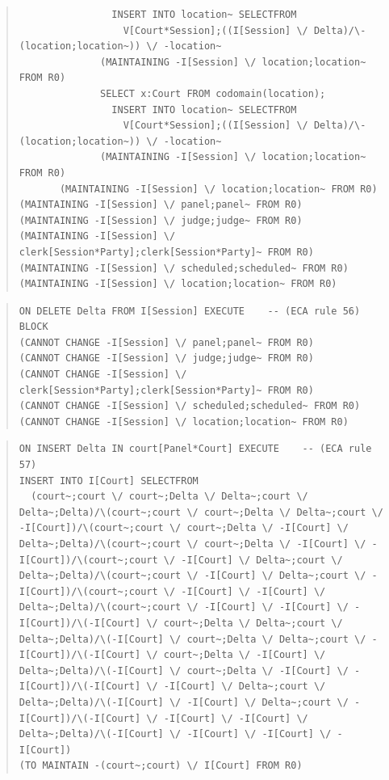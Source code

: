 \documentclass[10pt,a4paper]{report}              %
\theoremstyle{plain}\theorembodyfont{\rmfamily}\newtheorem{definition}{Definition}[section]
\theoremstyle{plain}\theorembodyfont{\rmfamily}\newtheorem{designrule}[definition]{Requirement}
\begin{document}
\begin{quote}
\begin{verbatim}
                INSERT INTO location~ SELECTFROM
                  V[Court*Session];((I[Session] \/ Delta)/\-(location;location~)) \/ -location~
              (MAINTAINING -I[Session] \/ location;location~ FROM R0)
              SELECT x:Court FROM codomain(location);
                INSERT INTO location~ SELECTFROM
                  V[Court*Session];((I[Session] \/ Delta)/\-(location;location~)) \/ -location~
              (MAINTAINING -I[Session] \/ location;location~ FROM R0)
       (MAINTAINING -I[Session] \/ location;location~ FROM R0)
(MAINTAINING -I[Session] \/ panel;panel~ FROM R0)
(MAINTAINING -I[Session] \/ judge;judge~ FROM R0)
(MAINTAINING -I[Session] \/ clerk[Session*Party];clerk[Session*Party]~ FROM R0)
(MAINTAINING -I[Session] \/ scheduled;scheduled~ FROM R0)
(MAINTAINING -I[Session] \/ location;location~ FROM R0)
\end{verbatim}
\end{quote}
\begin{quote}
\begin{verbatim}
ON DELETE Delta FROM I[Session] EXECUTE    -- (ECA rule 56)
BLOCK
(CANNOT CHANGE -I[Session] \/ panel;panel~ FROM R0)
(CANNOT CHANGE -I[Session] \/ judge;judge~ FROM R0)
(CANNOT CHANGE -I[Session] \/ clerk[Session*Party];clerk[Session*Party]~ FROM R0)
(CANNOT CHANGE -I[Session] \/ scheduled;scheduled~ FROM R0)
(CANNOT CHANGE -I[Session] \/ location;location~ FROM R0)
\end{verbatim}
\end{quote}
\begin{quote}
\begin{verbatim}
ON INSERT Delta IN court[Panel*Court] EXECUTE    -- (ECA rule 57)
INSERT INTO I[Court] SELECTFROM
  (court~;court \/ court~;Delta \/ Delta~;court \/ Delta~;Delta)/\(court~;court \/ court~;Delta \/ Delta~;court \/ -I[Court])/\(court~;court \/ court~;Delta \/ -I[Court] \/ Delta~;Delta)/\(court~;court \/ court~;Delta \/ -I[Court] \/ -I[Court])/\(court~;court \/ -I[Court] \/ Delta~;court \/ Delta~;Delta)/\(court~;court \/ -I[Court] \/ Delta~;court \/ -I[Court])/\(court~;court \/ -I[Court] \/ -I[Court] \/ Delta~;Delta)/\(court~;court \/ -I[Court] \/ -I[Court] \/ -I[Court])/\(-I[Court] \/ court~;Delta \/ Delta~;court \/ Delta~;Delta)/\(-I[Court] \/ court~;Delta \/ Delta~;court \/ -I[Court])/\(-I[Court] \/ court~;Delta \/ -I[Court] \/ Delta~;Delta)/\(-I[Court] \/ court~;Delta \/ -I[Court] \/ -I[Court])/\(-I[Court] \/ -I[Court] \/ Delta~;court \/ Delta~;Delta)/\(-I[Court] \/ -I[Court] \/ Delta~;court \/ -I[Court])/\(-I[Court] \/ -I[Court] \/ -I[Court] \/ Delta~;Delta)/\(-I[Court] \/ -I[Court] \/ -I[Court] \/ -I[Court])
(TO MAINTAIN -(court~;court) \/ I[Court] FROM R0)
\end{verbatim}
\end{quote}
\end{document}
